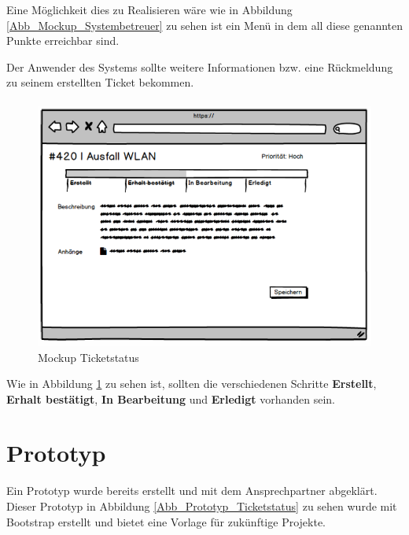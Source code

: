 Eine Möglichkeit dies zu Realisieren wäre wie in Abbildung \ref{Abb_Mockup_Systembetreuer} zu sehen ist ein Menü in dem all diese genannten Punkte erreichbar sind.
\newpage

Der Anwender des Systems sollte weitere Informationen bzw. eine Rückmeldung zu seinem erstellten Ticket bekommen.
\paragraph{}
\vspace{.5cm}
\begin{figure}[h]
	\centering
	\includegraphics[scale=0.582]{figures/Wireframe_Ticket.png}
	\caption{Mockup Ticketstatus}
	\label{Abb_Mockup_Ticketstatus}
\end{figure}	
Wie in Abbildung \ref{Abb_Mockup_Ticketstatus} zu sehen ist, sollten die verschiedenen Schritte \textbf{Erstellt}, \textbf{Erhalt bestätigt}, \textbf{In Bearbeitung} und \textbf{Erledigt} vorhanden sein.
\newpage

\section{Prototyp}
Ein Prototyp wurde bereits erstellt und mit dem Ansprechpartner abgeklärt. Dieser Prototyp in Abbildung  \ref{Abb_Prototyp_Ticketstatus} zu sehen wurde mit Bootstrap erstellt und bietet eine Vorlage für zukünftige Projekte.
